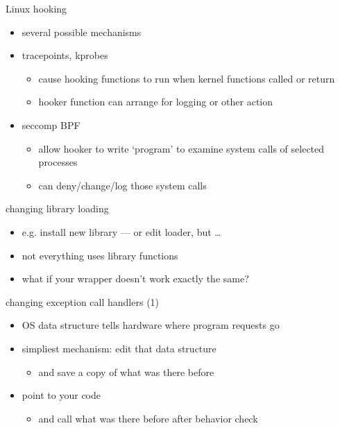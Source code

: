 \begin{frame}{Linux hooking}
\begin{itemize}
\item several possible mechanisms
\item tracepoints, kprobes
    \begin{itemize}
    \item cause hooking functions to run when kernel functions called or return
    \item hooker function can arrange for logging or other action
    \end{itemize}
\item seccomp BPF
    \begin{itemize}
    \item allow hooker to write `program' to examine system calls of selected processes
    \item can deny/change/log those system calls
    \end{itemize}
\end{itemize}
\end{frame}


\begin{frame}{changing library loading}
\begin{itemize}
    \item e.g. install new library --- or edit loader, but \ldots
    \vspace{.5cm}
    \item not everything uses library functions
    \item what if your wrapper doesn't work exactly the same?
\end{itemize}
\end{frame}


\begin{frame}{changing exception call handlers (1)}
    \begin{itemize}
    \item OS data structure tells hardware where program requests go
    \item simpliest mechanism: edit that data structure
       \begin{itemize}
       \item and save a copy of what was there before
       \end{itemize}
    \item point to your code
        \begin{itemize}
        \item and call what was there before after behavior check
        \end{itemize}
    \end{itemize}
\end{frame}

